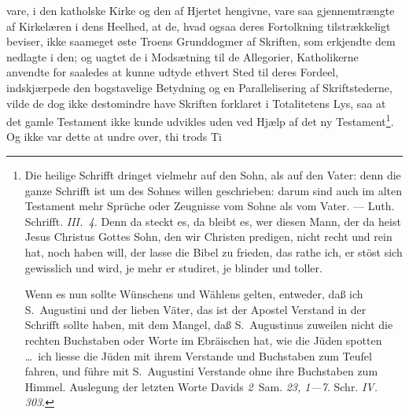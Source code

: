 \documentclass[12pt]{book}
\newcommand{\opage}[1]{\marginnote{\footnotesize\textit{[#1]}}}
\begin{document}
\opage{65} \setcounter{footnote}{0}%
vare, i den katholske Kirke og den af Hjertet hengivne, vare saa
gjennemtrængte af Kirkelæren i dens Heelhed, at de, hvad ogsaa deres
Fortolkning tilstrækkeligt beviser, ikke saameget øste Troens Grunddogmer af
Skriften, som erkjendte dem nedlagte i den; og uagtet de i Modsætning til de
Allegorier, Katholikerne anvendte for saaledes at kunne udtyde ethvert Sted
til deres Fordeel, indskjærpede den bogstavelige Betydning og en
Parallelisering af Skriftstederne, vilde de dog ikke destomindre have Skriften
forklaret i Totalitetens Lys, saa at det gamle Testament ikke kunde udvikles
uden ved Hjælp af det ny Testament\footnote{Die heilige Schrifft dringet
vielmehr auf den Sohn, als auf den Vater: denn die ganze Schrifft ist um des
Sohnes willen geschrieben: darum sind auch im alten Testament mehr Sprüche
oder Zeugnisse vom Sohne als vom Vater. --- Luth. Schrifft. \textit{III.~4.}
Denn da steckt es, da bleibt es, wer diesen Mann, der da heist Jesus Christus
Gottes Sohn, den wir Christen predigen, nicht recht und rein hat, noch haben
will, der lasse die Bibel zu frieden, das rathe ich, er stöst sich gewisslich
und wird, je mehr er studiret, je blinder und toller.

Wenn es nun sollte Wünschens und Wählens gelten, entweder, daß ich
S.~Augustini und der lieben Väter, das ist der Apostel Verstand in der
Schrifft sollte haben, mit dem Mangel, daß S.~Augustinus zuweilen nicht die
rechten Buchstaben oder Worte im Ebräischen hat, wie die Jüden spotten
\ldots\ ich liesse die Jüden mit ihrem Verstande und Buchstaben zum Teufel
fahren, und führe mit S.~Augustini Verstande ohne ihre Buchstaben zum Himmel.
Auslegung der letzten Worte Davids \textit{2}~Sam. \textit{23, 1---7}. Schr.
\textit{IV. 303}.}. Og ikke var dette at undre over, thi trods Ti\-%
\end{document}
